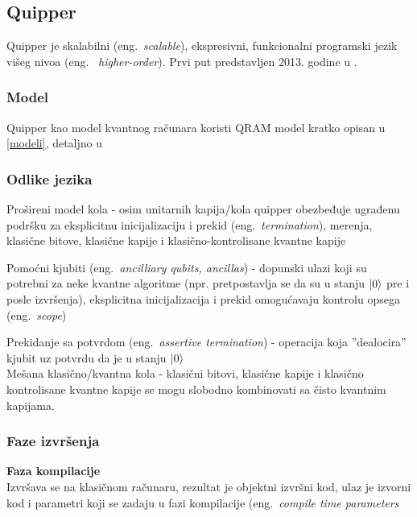 \documentclass[a4paper]{article}
\begin{document}
{\subsection{Quipper}
\label{sec:quipper}

Quipper je skalabilni (eng.~\emph{scalable}), ekspresivni, funkcionalni programski jezik višeg nivoa (eng.~ \emph{higher-order}).
Prvi put predstavljen 2013. godine u \cite{quipper_language}.

\subsubsection{Model}

Quipper kao model kvantnog računara koristi QRAM model kratko opisan u \ref{modeli}, detaljno u \cite{qram_model} 


\subsubsection{Odlike jezika}

Prošireni model kola - osim unitarnih kapija/kola quipper obezbeđuje ugrađenu podršku za eksplicitnu inicijalizaciju i prekid (eng.~\emph{termination}), merenja, klasične bitove, klasične kapije i klasično-kontrolisane kvantne kapije 

Pomoćni kjubiti (eng.~\emph{ancilliary qubits, ancillas}) - dopunski ulazi koji su potrebni za neke kvantne algoritme (npr. pretpostavlja se da su u stanju $\ket{0}$ pre i posle izvršenja), eksplicitna inicijalizacija i prekid omogućavaju kontrolu opsega (eng.~\emph{scope})

Prekidanje sa potvrdom (eng.~\emph{assertive termination}) - operacija koja ''dealocira'' kjubit uz potvrdu da je u stanju $\ket{0}$\\

Mešana klasično/kvantna kola - klasični bitovi, klasične kapije i klasično kontrolisane kvantne kapije se mogu slobodno kombinovati sa čisto kvantnim kapijama.

\subsubsection{Faze izvršenja}

\textbf{Faza kompilacije}\\
Izvršava se na klasičnom računaru, rezultat je objektni izvršni kod, ulaz je izvorni kod i parametri koji se zadaju u fazi kompilacije (eng.~\emph{compile time parameters}

}
\end{document}
